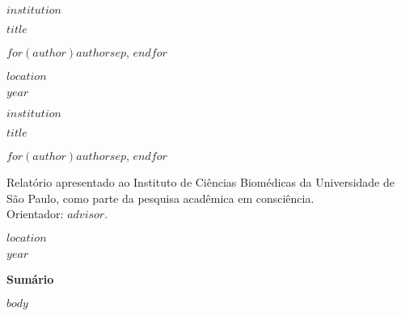 \usepackage{fontspec}
\setmainfont{Times New Roman}
\usepackage{polyglossia}
\setdefaultlanguage{portuguese}
\usepackage{setspace}
\onehalfspacing
\usepackage[left=3cm,right=2cm,top=3cm,bottom=2cm]{geometry}
\usepackage{hyperref}
\hypersetup{hidelinks}
\usepackage{tocloft}
\setlength\cftbeforesecskip{6pt}
\usepackage{titlesec}
\titleformat{\section}{\bfseries\normalsize}{\thesection}{0.6em}{}
\titleformat{\subsection}{\normalsize}{\thesubsection}{0.6em}{}
\usepackage{fancyhdr}
\pagestyle{fancy}
\fancyhf{}
\fancyhead[R]{\thepage}
\renewcommand{\headrulewidth}{0pt}
\newcommand{\ABNTTitle}{$title$}
\newcommand{\ABNTAuthor}{$for(author)$$author$$sep$, $endfor$}
\newcommand{\ABNTAdvisor}{$advisor$}
\newcommand{\ABNTInstit}{$institution$}
\newcommand{\ABNTCity}{$location$}
\newcommand{\ABNTYear}{$year$}

\thispagestyle{empty}
\begin{center}
{\large \textbf{\ABNTInstit}\par}
\vfill
{\LARGE \textbf{\ABNTTitle}\par}
\vfill
{\large \ABNTAuthor\par}
\vfill
{\large \ABNTCity\par}
{\large \ABNTYear\par}
\end{center}
\clearpage
\thispagestyle{empty}
\begin{center}
{\large \textbf{\ABNTInstit}\par}
\vfill
{\LARGE \textbf{\ABNTTitle}\par}
\vspace{1.5em}
{\large \ABNTAuthor\par}
\vspace{2em}
\begin{minipage}{0.75\textwidth}
\noindent Relatório apresentado ao Instituto de Ciências Biomédicas da Universidade de São Paulo, como parte da pesquisa acadêmica em consciência.\\
\noindent Orientador: \ABNTAdvisor.
\end{minipage}
\vfill
{\large \ABNTCity\par}
{\large \ABNTYear\par}
\end{center}
\clearpage
{\bfseries\large Sumário}\par
\tableofcontents
\clearpage
\setcounter{page}{1}
$body$

